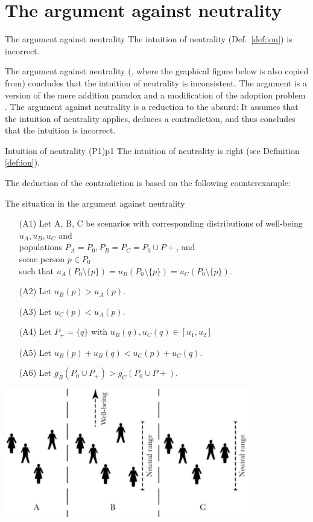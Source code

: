 \section{The argument against neutrality}

\begin{Theorem}{The argument against neutrality}{}
The intuition of neutrality (Def.~\ref{def:ion}) is incorrect.
\end{Theorem}

The argument against neutrality (, where the graphical figure below is also copied from) concludes that the intuition of neutrality is inconsistent. The argument is a version of the mere addition paradox \cite[p.~148]{broome_2004} and a modification of the adoption problem \cite[p.~161]{broome_2004}. The argument against neutrality is a reduction to the absurd: It assumes that the intuition of neutrality applies, deduces a contradiction, and thus concludes that the intuition is incorrect. 

\begin{Premise}{Intuition of neutrality (P1)}{p1}
The intuition of neutrality is right (see Definition \ref{def:ion}).
\end{Premise}

The deduction of the contradiction is based on the following counterexample: 

\begin{Counterexample}{The situation in the argument against neutrality}{}
\begin{enumerate}
\item[(A1)]
Let A, B, C be scenarios with  
corresponding distributions of well-being $u_A, u_B, u_C$ and \\
populations $P_A = P_0, P_B = P_C = P_0 \cup P+$, and \\
some person $p \in P_0$ \\
such that $u_A(P_0 \setminus \{p\}) = u_B(P_0 \setminus \{p\}) = u_C(P_0 \setminus \{p\}).$
\item[(A2)] Let $u_B(p) > u_A(p).$
\item[(A3)] Let $u_C(p) < u_A(p).$
\item[(A4)] Let $P_+ = \{q\}$ with $u_B(q), u_C(q) \in [u_1, u_2]$
\item[(A5)] Let $u_B(p) + u_B(q) < u_C(p) + u_C(q).$
\item[(A6)] Let $g_B(P_0 \cup P_+) > g_C(P_0 \cup P+)$. 
\end{enumerate}
\begin{center}
  \includegraphics[width=0.8\textwidth]{3-fig-1}
\end{center}
\end{Counterexample}

